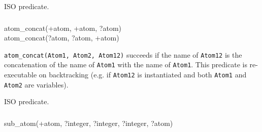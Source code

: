 \Portability

ISO predicate.

\subsubsection{}

\begin{TemplatesOneCol}
atom\_concat(+atom, +atom, ?atom)\\
atom\_concat(?atom, ?atom, +atom)

\end{TemplatesOneCol}

\Description

\texttt{atom\_concat(Atom1, Atom2, Atom12)} succeeds if the name of
\texttt{Atom12} is the concatenation of the name of \texttt{Atom1} with the
name of \texttt{Atom1}. This predicate is re-executable on backtracking
(e.g. if \texttt{Atom12} is instantiated and both \texttt{Atom1} and
\texttt{Atom2} are variables).

\begin{PlErrors}






\end{PlErrors}

\Portability

ISO predicate.

\subsubsection{}

\begin{TemplatesOneCol}
sub\_atom(+atom, ?integer, ?integer, ?integer, ?atom)

\end{TemplatesOneCol}

\Description


